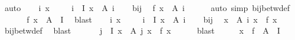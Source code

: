 \begin{isabellebody}
\ auto\isanewline
{}\isamarkupfalse%
\isanewline
\ \ \isamarkupfalse%
\ i\ x\isanewline
\ \ \isamarkupfalse%
\ {\isacharasterisk}{\kern0pt}{\isacharcolon}{\kern0pt}\ {\isachardoublequoteopen}i\ {\isasymin}\ I{\isachardoublequoteclose}\ {\isachardoublequoteopen}x\ {\isasymin}\ A\ i{\isachardoublequoteclose}\isanewline
\ \ \isamarkupfalse%
\ bij\ \isamarkupfalse%
\ {\isachardoublequoteopen}f\ x\ {\isasymin}\ A{\isacharprime}{\kern0pt}\ i{\isachardoublequoteclose}\isanewline
\ \ \ \ \isamarkupfalse%
\ {\isacharparenleft}{\kern0pt}auto\ simp{\isacharcolon}{\kern0pt}\ bij{\isacharunderscore}{\kern0pt}betw{\isacharunderscore}{\kern0pt}def{\isacharparenright}{\kern0pt}\isanewline
\ \ \isamarkupfalse%
\ {\isacharasterisk}{\kern0pt}\ \isamarkupfalse%
\ {\isachardoublequoteopen}f\ x\ {\isasymin}\ {\isasymUnion}{\isacharparenleft}{\kern0pt}A{\isacharprime}{\kern0pt}\ {\isacharbackquote}{\kern0pt}\ I{\isacharparenright}{\kern0pt}{\isachardoublequoteclose}\ \isamarkupfalse%
\ blast\isanewline
{}\isamarkupfalse%
\isanewline
\ \ \isamarkupfalse%
\ i\ x{\isacharprime}{\kern0pt}\isanewline
\ \ \isamarkupfalse%
\ {\isacharasterisk}{\kern0pt}{\isacharcolon}{\kern0pt}\ {\isachardoublequoteopen}i\ {\isasymin}\ I{\isachardoublequoteclose}\ {\isachardoublequoteopen}x{\isacharprime}{\kern0pt}\ {\isasymin}\ A{\isacharprime}{\kern0pt}\ i{\isachardoublequoteclose}\isanewline
\ \ \isamarkupfalse%
\ bij\ \isamarkupfalse%
\ {\isachardoublequoteopen}{\isasymexists}x\ {\isasymin}\ A\ i{\isachardot}{\kern0pt}\ x{\isacharprime}{\kern0pt}\ {\isacharequal}{\kern0pt}\ f\ x{\isachardoublequoteclose}\isanewline
\ \ \ \ \isamarkupfalse%
\ bij{\isacharunderscore}{\kern0pt}betw{\isacharunderscore}{\kern0pt}def\ \isamarkupfalse%
\ blast\isanewline
\ \ \isamarkupfalse%
\ {\isacharasterisk}{\kern0pt}\ \isamarkupfalse%
\ {\isachardoublequoteopen}{\isasymexists}j\ {\isasymin}\ I{\isachardot}{\kern0pt}\ {\isasymexists}x\ {\isasymin}\ A\ j{\isachardot}{\kern0pt}\ x{\isacharprime}{\kern0pt}\ {\isacharequal}{\kern0pt}\ f\ x{\isachardoublequoteclose}\isanewline
\ \ \ \ \isamarkupfalse%
\ blast\isanewline
\ \ \isamarkupfalse%
\ \isamarkupfalse%
\ {\isachardoublequoteopen}x{\isacharprime}{\kern0pt}\ {\isasymin}\ f\ {\isacharbackquote}{\kern0pt}\ {\isasymUnion}{\isacharparenleft}{\kern0pt}A\ {\isacharbackquote}{\kern0pt}\ I{\isacharparenright}{\kern0pt}{\isachardoublequoteclose}\isanewline

\end{isabellebody}
